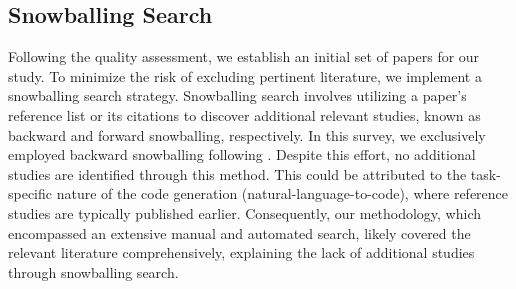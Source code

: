 \subsection{Snowballing Search}\label{sec:review_snowballing}
Following the quality assessment, we establish an initial set of papers for our study. 
To minimize the risk of excluding pertinent literature, we implement a snowballing search strategy. Snowballing search involves utilizing a paper's reference list or its citations to discover additional relevant studies, known as backward and forward snowballing, respectively. 
In this survey, we exclusively employed backward snowballing following \cite{wang2024software}.
Despite this effort, no additional studies are identified through this method. This could be attributed to the task-specific nature of the code generation (natural-language-to-code), where reference studies are typically published earlier. 
Consequently, our methodology, which encompassed an extensive manual and automated search, likely covered the relevant literature comprehensively, explaining the lack of additional studies through snowballing search.

